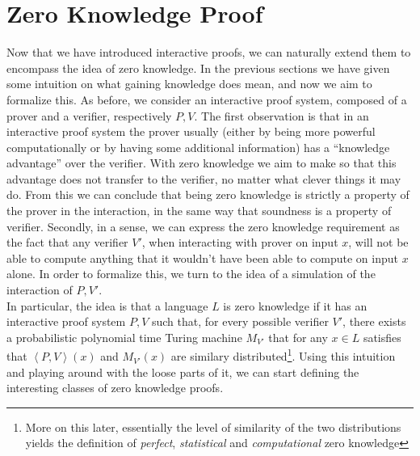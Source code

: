 \documentclass{article}
\begin{document}
\section{Zero Knowledge Proof}
\label{zkp}
Now that we have introduced interactive proofs, we can naturally extend them to encompass the idea of zero knowledge. In the previous sections we have given some intuition on what gaining knowledge does mean, and now we aim to formalize this. As before, we consider an interactive proof system, composed of a prover and a verifier, respectively $P, V$. The first observation is that in an interactive proof system the prover usually (either by being more powerful computationally or by having some additional information) has a \enquote{knowledge advantage} over the verifier. With zero knowledge we aim to make so that this advantage does not transfer to the verifier, no matter what clever things it may do. From this we can conclude that being zero knowledge is strictly a property of the prover in the interaction, in the same way that soundness is a property of verifier. Secondly, in a sense, we can express the zero knowledge requirement as the fact that any verifier $V'$, when interacting with prover on input $x$, will not be able to compute anything that it wouldn't have been able to compute on input $x$ alone. In order to formalize this, we turn to the idea of a simulation of the interaction of $P, V'$. \\
In particular, the idea is that a language $L$ is zero knowledge if it has an interactive proof system $P, V$ such that, for every possible verifier $V'$, there exists a probabilistic polynomial time Turing machine $M_{V'}$ that for any $x \in L$ satisfies that $\left<P, V\right>(x)$ and $M_{V'}(x)$ are similary distributed\footnote{More on this later, essentially the level of similarity of the two distributions yields the definition of \textit{perfect}, \textit{statistical} and \textit{computational} zero knowledge}.
Using this intuition and playing around with the loose parts of it, we can start defining the interesting classes of zero knowledge proofs.
\end{document}
